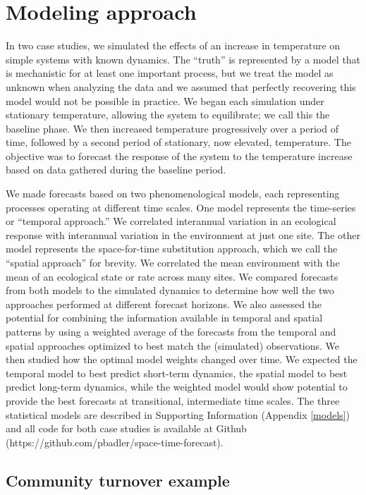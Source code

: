 \documentclass[11pt]{article}
\begin{document}
\section*{Modeling approach}

In two case studies, we simulated the effects of an increase in temperature on simple systems with known dynamics.
The ``truth'' is represented by a model that is mechanistic for at least one important process, but we treat the model as unknown when
analyzing the data and we assumed that perfectly recovering this model would not be possible in practice. We began each simulation
under stationary temperature, allowing the system to equilibrate; we call this the baseline phase. 
We then increased temperature progressively over a period of time, followed by a second period of stationary, now elevated, temperature. 
The objective was to forecast the response of the system to the temperature increase based on data gathered during the baseline period. 

We made forecasts based on two phenomenological models, each representing processes operating at different time scales. One model represents the time-series or ``temporal approach.'' We correlated interannual variation in an ecological response with interannual variation in the environment at just one site. The other model represents the space-for-time substitution approach, which we call the ``spatial approach'' for brevity. We correlated the mean environment with the mean of an ecological state or rate across many sites.  We compared forecasts from both models to the simulated dynamics to determine how well the two approaches performed at different forecast horizons. We also assessed the potential for combining the information available in temporal and spatial patterns by using a weighted average of the forecasts from the temporal and spatial approaches optimized to best match the (simulated) observations. We then studied how the optimal model weights changed over time. We expected the temporal model to best predict short-term dynamics, the spatial model to best predict long-term dynamics, while the weighted model would show potential to provide the best forecasts at transitional, intermediate time scales. The three statistical models are described in Supporting Information (Appendix \ref{models}) and all code for both case studies is available at Github (https://github.com/pbadler/space-time-forecast).

\subsection*{Community turnover example}
\end{document}
